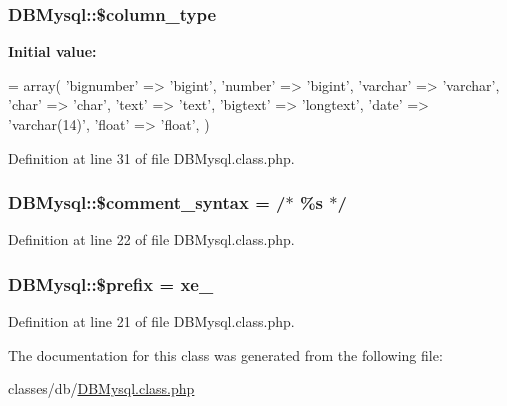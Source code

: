 \subsubsection[{\texorpdfstring{\$column\+\_\+type}{$column_type}}]{\setlength{\rightskip}{0pt plus 5cm}D\+B\+Mysql\+::\$column\+\_\+type}\hypertarget{classDBMysql_aa93c8f5f14304a16864a0708a3ba41b0}{}\label{classDBMysql_aa93c8f5f14304a16864a0708a3ba41b0}
{\bfseries Initial value\+:}
\begin{DoxyCode}
= array(
        \textcolor{stringliteral}{'bignumber'} => \textcolor{stringliteral}{'bigint'},
        \textcolor{stringliteral}{'number'} => \textcolor{stringliteral}{'bigint'},
        \textcolor{stringliteral}{'varchar'} => \textcolor{stringliteral}{'varchar'},
        \textcolor{stringliteral}{'char'} => \textcolor{stringliteral}{'char'},
        \textcolor{stringliteral}{'text'} => \textcolor{stringliteral}{'text'},
        \textcolor{stringliteral}{'bigtext'} => \textcolor{stringliteral}{'longtext'},
        \textcolor{stringliteral}{'date'} => \textcolor{stringliteral}{'varchar(14)'},
        \textcolor{stringliteral}{'float'} => \textcolor{stringliteral}{'float'},
    )
\end{DoxyCode}


Definition at line 31 of file D\+B\+Mysql.\+class.\+php.

\subsubsection[{\texorpdfstring{\$comment\+\_\+syntax}{$comment_syntax}}]{\setlength{\rightskip}{0pt plus 5cm}D\+B\+Mysql\+::\$comment\+\_\+syntax = \textquotesingle{}/$\ast$ \%{\bf s} $\ast$/\textquotesingle{}}\hypertarget{classDBMysql_a2c00f6e29c9e4fc4a532f806cf4313c2}{}\label{classDBMysql_a2c00f6e29c9e4fc4a532f806cf4313c2}


Definition at line 22 of file D\+B\+Mysql.\+class.\+php.

\subsubsection[{\texorpdfstring{\$prefix}{$prefix}}]{\setlength{\rightskip}{0pt plus 5cm}D\+B\+Mysql\+::\$prefix = \textquotesingle{}xe\+\_\+\textquotesingle{}}\hypertarget{classDBMysql_ac95b2047c4c75730e0533be0cccd19d9}{}\label{classDBMysql_ac95b2047c4c75730e0533be0cccd19d9}


Definition at line 21 of file D\+B\+Mysql.\+class.\+php.



The documentation for this class was generated from the following file\+:\begin{DoxyCompactItemize}
\item 
classes/db/\hyperlink{DBMysql_8class_8php}{D\+B\+Mysql.\+class.\+php}\end{DoxyCompactItemize}
